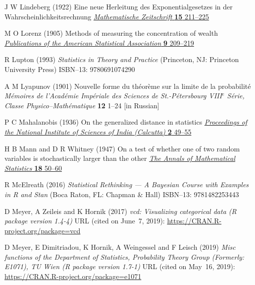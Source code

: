 \begin{thebibliography}{99}
J W Lindeberg
(1922) Eine neue Herleitung des Exponentialgesetzes in der 
Wahrscheinlichkeitsrechnung
\href{http://dx.doi.org/10.1007/BF01494395}{\textit{Mathematische 
Zeitschrift} \textbf{15} 211--225}

M O Lorenz
(1905) Methods of measuring the concentration of wealth
\href{http://dx.doi.org/10.2307/2276207}{\textit{Publications of
the American Statistical Association} \textbf{9} 209--219}

R Lupton
(1993) \textit{Statistics in Theory and Practice}
(Princeton, NJ: Princeton University Press)
ISBN--13: 9780691074290

A M Lyapunov
(1901) Nouvelle forme du th\'{e}or\`{e}me sur la limite de la 
probabilit\'{e}
\textit{M\'{e}moires de l'Acad\'{e}mie Imp\'{e}riale des Sciences de 
St.-P\'{e}tersbourg VIII$^{e}$ S\'{e}rie, Classe 
Physico--Math\'{e}matique} \textbf{12} 1--24 [in Russian]

P C Mahalanobis
(1936) On the generalized distance in statistics
\href{http://www.new.dli.ernet.in/rawdataupload/upload/insa/INSA_1/20006193_49.pdf}{\textit{Proceedings of the National Institute of 
Sciences of India (Calcutta)} \textbf{2} 49--55}

H B Mann and D R Whitney
(1947) On a test of whether one of two random variables
is stochastically larger than the other
\href{http://projecteuclid.org/euclid.aoms/1177730491}{\textit{The 
Annals of Mathematical Statistics} \textbf{18} 50--60}

R McElreath
(2016) \textit{Statistical Rethinking --- A Bayesian Course with 
Examples in R and Stan}
(Boca Raton, FL: Chapman \& Hall) ISBN--13: 9781482253443

D Meyer, A Zeileis and K Hornik
(2017) \textit{vcd: Visualizing categorical data
(R package version 1.4-4)}
URL (cited on June~7, 2019): 
\href{https://CRAN.R-project.org/package=vcd}{https://CRAN.R-project.org/package=vcd}

D Meyer, E Dimitriadou, K Hornik, A Weingessel and F Leisch
(2019) \textit{Misc functions of the Department of Statistics,
Probability Theory Group (Formerly: E1071), TU Wien
(R package version 1.7-1)}
URL (cited on May~16, 2019):
\href{https://CRAN.R-project.org/package=e1071}{https://CRAN.R-project.org/package=e1071}


\end{thebibliography}
